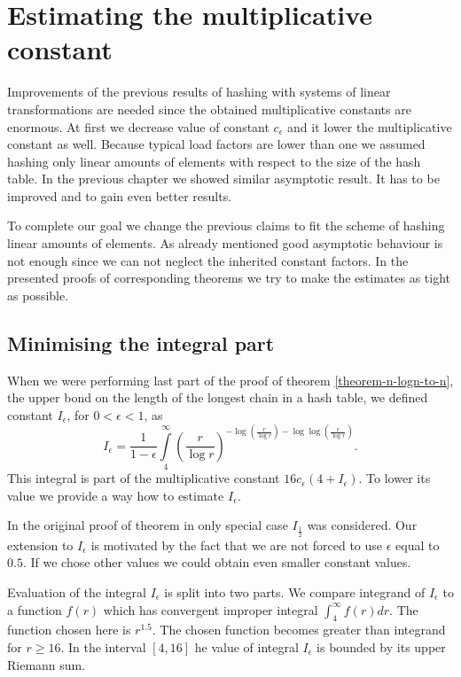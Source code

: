 \chapter{Estimating the multiplicative constant}
Improvements of the previous results of hashing with systems of linear transformations are needed since the obtained multiplicative constants are enormous. At first we decrease value of constant $c_\epsilon$ and it lower the multiplicative constant as well. Because typical load factors are lower than one we assumed hashing only linear amounts of elements with respect to the size of the hash table. In the previous chapter we showed similar asymptotic result. It has to be improved and to gain even better results.

To complete our goal we change the previous claims to fit the scheme of hashing linear amounts of elements. As already mentioned good asymptotic behaviour is not enough since we can not neglect the inherited constant factors. In the presented proofs of corresponding theorems we try to make the estimates as tight as possible.

\section{Minimising the integral part}
\label{section-integral-estimate}
When we were performing last part of the proof of theorem \ref{theorem-n-logn-to-n}, the upper bond on the length of the longest chain in a hash table, we defined constant $I_\epsilon$, for $0 < \epsilon < 1$, as
\[
I_{\epsilon} = \frac{1}{1 - \epsilon} \displaystyle\int\limits_4^\infty \left(\frac{r}{\log r}\right)^{-\log \left(\frac{r}{\log r}\right) - \log \log \left(\frac{r}{\log r}\right)} \text{.}
\]
This integral is part of the multiplicative constant $16c_\epsilon(4 + I_\epsilon)$. To lower its value we provide a way how to estimate $I_\epsilon$.

In the original proof of theorem in \cite{DBLP:journals/jacm/AlonDMPT99} only special case $I_{\frac{1}{2}}$ was considered. Our extension to $I_\epsilon$ is motivated by the fact that we are not forced to use $\epsilon$ equal to $0.5$. If we chose other values we could obtain even smaller constant values.

Evaluation of the integral $I_\epsilon$ is split into two parts. We compare integrand of $I_\epsilon$ to a function $f(r)$ which has convergent improper integral $\int_{4}^{\infty} f(r) dr$. The function chosen here is $r^{1.5}$. The chosen function becomes greater than integrand for $r \geq 16$. In the interval $[4, 16]$ he value of integral $I_\epsilon$ is bounded by its upper Riemann sum.

